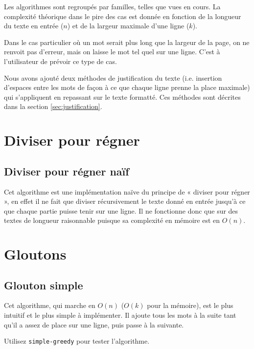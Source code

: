 \documentclass[a4paper, 11pt]{article}
\begin{document}
Les algorithmes sont regroupés par familles, telles que vues en cours.
La complexité théorique dans le pire des cas est donnée en fonction de la
longueur du texte en entrée ($n$) et de la largeur maximale d'une ligne ($k$).

Dans le cas particulier où un mot serait plus long que la largeur de la page, on
ne renvoit pas d'erreur, mais on laisse le mot tel quel sur une ligne. C'est à
l'utilisateur de prévoir ce type de cas.

Nous avons ajouté deux méthodes de justification du texte (i.e. insertion
d'espaces entre les mots de façon à ce que chaque ligne prenne la place
maximale) qui s'appliquent en repassant sur le texte formatté. Ces méthodes
sont décrites dans la section \ref{sec:justification}.

\section{Diviser pour régner}

\subsection{Diviser pour régner naïf}

Cet algorithme est une implémentation naïve du principe de « diviser pour régner
», en effet il ne fait que diviser récursivement le texte donné en entrée
jusqu'à ce que chaque partie puisse tenir sur une ligne. Il ne fonctionne donc
que sur des textes de longueur raisonnable puisque sa complexité en mémoire est
en $O(n)$. %

\section{Gloutons}

\subsection{Glouton simple}

Cet algorithme, qui marche en $O(n)$ ($O(k)$ pour la mémoire), est le plus
intuitif et le plus simple à implémenter. Il ajoute tous les mots à la suite
tant qu'il a assez de place sur une ligne, puis passe à la suivante.

Utilisez \verb|simple-greedy| pour tester l’algorithme.

% 
%
\end{document}
